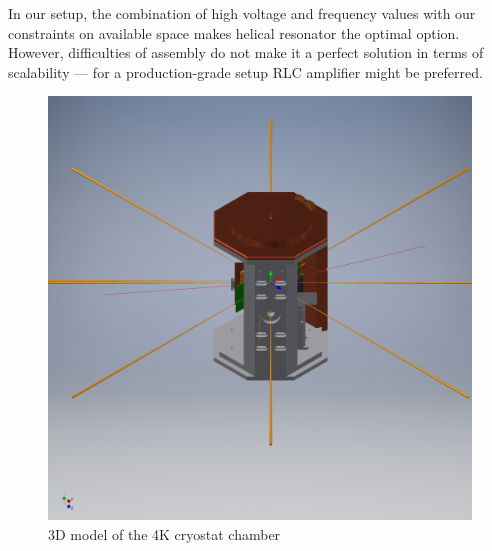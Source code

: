 In our setup, the combination of high voltage and frequency values with our constraints on available space makes helical resonator the optimal option. However, difficulties of assembly do not make it a perfect solution in terms of scalability --- for a production-grade setup RLC amplifier might be preferred.

\begin{figure}[h]
	\includegraphics[width=\textwidth]{images/4K_chamber}
	\caption{3D model of the 4K cryostat chamber}
	\label{fig:4K_chamber}
\end{figure}